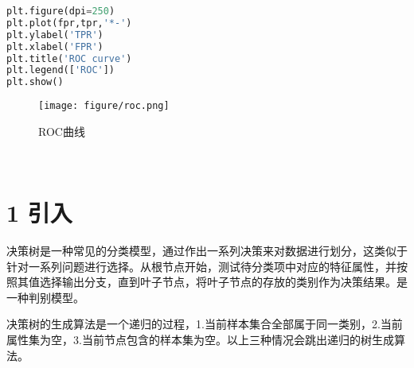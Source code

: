 \documentclass[twoside]{article}
\begin{document}
\begin{enumerate}
\begin{lstlisting}[language={python}]
plt.figure(dpi=250)
plt.plot(fpr,tpr,'*-')
plt.ylabel('TPR')
plt.xlabel('FPR')
plt.title('ROC curve')
plt.legend(['ROC'])
plt.show()
\end{lstlisting}
\begin{figure}[h]
    \centering
    \texttt{[image: figure/roc.png]}
    \caption{ROC曲线}
\end{figure}
\end{enumerate}
\clearpage
{} \vspace{2mm} \\
\section*{1 引入}
决策树是一种常见的分类模型，通过作出一系列决策来对数据进行划分，这类似于针对一系列问题进行选择。从根节点开始，测试待分类项中对应的特征属性，并按照其值选择输出分支，直到叶子节点，将叶子节点的存放的类别作为决策结果。是一种判别模型。

决策树的生成算法是一个递归的过程，1.当前样本集合全部属于同一类别，2.当前属性集为空，3.当前节点包含的样本集为空。以上三种情况会跳出递归的树生成算法。
\end{document}
